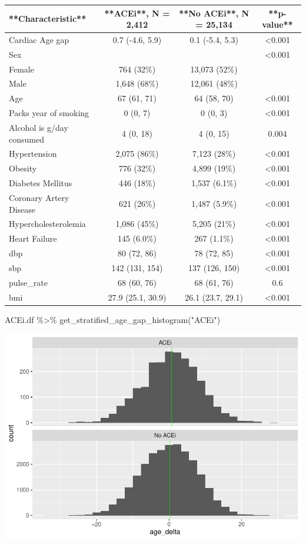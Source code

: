 \documentclass[
]{article}
\newenvironment{Shaded}{\begin{snugshade}}{\end{snugshade}}
\newcommand{\FunctionTok}[1]{\textcolor[rgb]{0.00,0.00,0.00}{#1}}
\newcommand{\NormalTok}[1]{#1}
\newcommand{\SpecialCharTok}[1]{\textcolor[rgb]{0.00,0.00,0.00}{#1}}
\newcommand{\StringTok}[1]{\textcolor[rgb]{0.31,0.60,0.02}{#1}}
\begin{document}
\begin{tabular}{l|c|c|c}
\hline
**Characteristic** & **ACEi**, N = 2,412 & **No ACEi**, N = 25,134 & **p-value**\\
\hline
Cardiac Age gap & 0.7 (-4.6, 5.9) & 0.1 (-5.4, 5.3) & <0.001\\
\hline
Sex &  &  & <0.001\\
\hline
Female & 764 (32\%) & 13,073 (52\%) & \\
\hline
Male & 1,648 (68\%) & 12,061 (48\%) & \\
\hline
Age & 67 (61, 71) & 64 (58, 70) & <0.001\\
\hline
Packs year of smoking & 0 (0, 7) & 0 (0, 3) & <0.001\\
\hline
Alcohol is g/day consumed & 4 (0, 18) & 4 (0, 15) & 0.004\\
\hline
Hypertension & 2,075 (86\%) & 7,123 (28\%) & <0.001\\
\hline
Obesity & 776 (32\%) & 4,899 (19\%) & <0.001\\
\hline
Diabetes Mellitus & 446 (18\%) & 1,537 (6.1\%) & <0.001\\
\hline
Coronary Artery Disease & 621 (26\%) & 1,487 (5.9\%) & <0.001\\
\hline
Hypercholesterolemia & 1,086 (45\%) & 5,205 (21\%) & <0.001\\
\hline
Heart Failure & 145 (6.0\%) & 267 (1.1\%) & <0.001\\
\hline
dbp & 80 (72, 86) & 78 (72, 85) & <0.001\\
\hline
sbp & 142 (131, 154) & 137 (126, 150) & <0.001\\
\hline
pulse\_rate & 68 (60, 76) & 68 (61, 76) & 0.6\\
\hline
bmi & 27.9 (25.1, 30.9) & 26.1 (23.7, 29.1) & <0.001\\
\hline
\end{tabular}

\begin{Shaded}
\begin{Highlighting}[]
\NormalTok{ACEi.df }\SpecialCharTok{\%\textgreater{}\%} 
  \FunctionTok{get\_stratified\_age\_gap\_histogram}\NormalTok{(}\StringTok{"ACEi"}\NormalTok{)}
\end{Highlighting}
\end{Shaded}

\includegraphics{../results/report_files/figure-latex/ACEi-age-gap-histograms-1.pdf}
\end{document}
